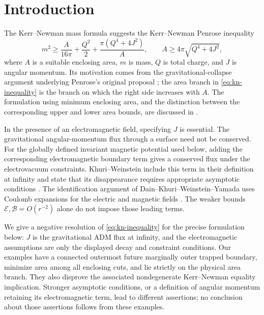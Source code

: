 \section{Introduction}\label{sec:introduction}

The Kerr--Newman mass formula suggests the Kerr--Newman Penrose inequality
\begin{equation}\label{eq:kn-inequality}
 m^2\ge \frac{A}{16\pi}+\frac{Q^2}{2}
             +\frac{\pi(Q^4+4J^2)}{A},
 \qquad A\ge4\pi\sqrt{Q^4+4J^2},
\end{equation}
where \(A\) is a suitable enclosing area, \(m\) is mass, \(Q\) is total
charge, and \(J\) is angular momentum. Its motivation comes from the
gravitational-collapse argument underlying Penrose's original proposal
\cite{Penrose1973}; the area branch in \eqref{eq:kn-inequality} is the branch
on which the right side increases with \(A\). The formulation using minimum
enclosing area, and the distinction between the corresponding upper and
lower area bounds, are discussed in \cite{DKWY2013}.

In the presence of an electromagnetic field, specifying \(J\) is essential.
The gravitational angular-momentum flux through a surface need not be
conserved. For the globally defined invariant magnetic potential used
below, adding the corresponding electromagnetic boundary term gives a
conserved flux under the electrovacuum constraints.
Khuri--Weinstein include this term in their definition at infinity and
state that its disappearance requires appropriate asymptotic conditions
\cite[Equation~(1.12) and the following paragraph]{KW2016}.
The identification argument of Dain--Khuri--Weinstein--Yamada uses
Coulomb expansions for the electric and magnetic fields
\cite[Equations~(2.20) and~(2.22)]{DKWY2013}.
The weaker bounds \(\mathcal E,\mathcal B=O(r^{-2})\) alone do not impose
those leading terms.

We give a negative resolution of \eqref{eq:kn-inequality} for the precise
formulation below: \(J\) is the gravitational ADM flux at infinity, and the
electromagnetic assumptions are only the displayed decay and constraint
conditions. Our examples have a connected outermost future marginally
outer trapped boundary, minimize area among all enclosing cuts, and lie
strictly on the physical area branch. They also disprove the associated
nondegenerate Kerr--Newman equality implication. Stronger asymptotic
conditions, or a definition of angular momentum retaining its
electromagnetic term, lead to different assertions; no conclusion about
those assertions follows from these examples.

